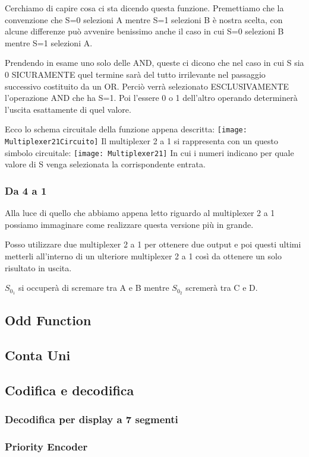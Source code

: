 \documentclass{book}
\begin{document}
Cerchiamo di capire cosa ci sta dicendo questa funzione.
Premettiamo che la convenzione che S=0 selezioni A mentre S=1 selezioni B è nostra scelta, con alcune differenze può avvenire benissimo anche il caso in cui S=0 selezioni B mentre S=1 selezioni A.

Prendendo in esame uno solo delle AND, queste ci dicono che nel caso in cui S sia 0 SICURAMENTE quel termine sarà del tutto irrilevante nel passaggio successivo costituito da un OR.
Perciò verrà selezionato ESCLUSIVAMENTE l'operazione AND che ha S=1.
Poi l'essere 0 o 1 dell'altro operando determinerà l'uscita esattamente di quel valore.

Ecco lo schema circuitale della funzione appena descritta:
\texttt{[image: Multiplexer21Circuito]}
Il multiplexer 2 a 1 si rappresenta con un questo simbolo circuitale:
\texttt{[image: Multiplexer21]}
In cui i numeri indicano per quale valore di S venga selezionata la corrispondente entrata.
\subsubsection{Da 4 a 1}
Alla luce di quello che abbiamo appena letto riguardo al multiplexer 2 a 1 possiamo immaginare come realizzare questa versione più in grande.

Posso utilizzare due multiplexer 2 a 1 per ottenere due output e poi questi ultimi metterli all'interno di un ulteriore multiplexer 2 a 1 così da ottenere un solo risultato in uscita.

\(S_0_1 \) si occuperà di scremare tra A e B mentre \(S_0_2 \) scremerà tra C e D.


\subsection{Odd Function}
\subsection{Conta Uni}
\subsection{Codifica e decodifica}


\subsubsection{Decodifica per display a 7 segmenti}


\subsubsection{Priority Encoder}
\end{document}

